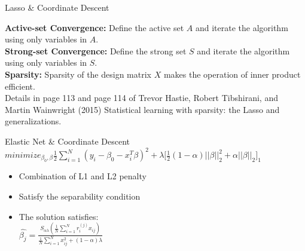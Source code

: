 \documentclass[handout]{beamer}
\begin{document}
\begin{frame}{Lasso \& Coordinate Descent }

\textbf{Active-set Convergence:} Define the
active set $A$ and iterate the algorithm using only  variables in $A$.\\
\vspace*{3mm}
\textbf{Strong-set Convergence:}  Define the strong set $S$ and iterate the algorithm using only variables in $S$.\\
\vspace*{3mm}
\textbf{Sparsity:} Sparsity of the design matrix $X$ makes the operation of inner product efficient.\\
\vspace*{3mm}
Details in page 113 and page 114 of Trevor Hastie, Robert Tibshirani, and Martin Wainwright (2015) Statistical learning with sparsity: the Lasso and generalizations. 

\end{frame}

\begin{frame}{Elastic Net \& Coordinate Descent}
\(minimize_{\beta_0,\beta}\frac{1}{2}\sum_{i=1}^{N}(y_{i}-\beta_{0}-x_i^{T}\beta)^2+\lambda \big[\frac{1}{2}(1-\alpha)\lvert\lvert\beta\rvert\rvert_2^2 + \alpha\lvert\lvert\beta \rvert\rvert_2\big]_1\)
\vspace*{4mm}
\begin{itemize}
    \item Combination of L1 and L2 penalty 
   \vspace*{3mm}
    \item Satisfy the separability condition
    \vspace*{3mm}
    \item The solution satisfies:\\
    \vspace*{3mm}
    \(\hat{\beta_j}=\frac{S_{\alpha\lambda}(\frac{1}{N}\sum_{i=1}^{N}r_i^{(j)} x_{ij} )}{\frac{1}{N}\sum_{i=1}^{N}x_{ij}^2+(1-\alpha)\lambda}\)\\
\end{itemize}



\end{frame}
\end{document}
